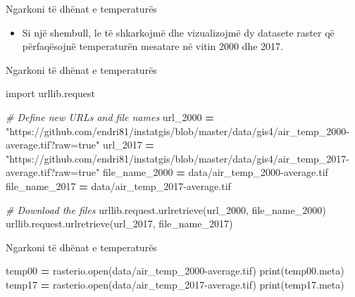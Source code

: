 \documentclass[
  ignorenonframetext,
]{beamer}
\newenvironment{Shaded}{\begin{snugshade}}{\end{snugshade}}
\newcommand{\BuiltInTok}[1]{#1}
\newcommand{\CommentTok}[1]{\textcolor[rgb]{0.56,0.35,0.01}{\textit{#1}}}
\newcommand{\ImportTok}[1]{#1}
\newcommand{\NormalTok}[1]{#1}
\newcommand{\OperatorTok}[1]{\textcolor[rgb]{0.81,0.36,0.00}{\textbf{#1}}}
\newcommand{\StringTok}[1]{\textcolor[rgb]{0.31,0.60,0.02}{#1}}
\providecommand{\tightlist}{%
  \setlength{\itemsep}{0pt}\setlength{\parskip}{0pt}}
\begin{document}
\begin{frame}{Ngarkoni të dhënat e temperaturës}
\protect\hypertarget{ngarkoni-tuxeb-dhuxebnat-e-temperaturuxebs}{}
\begin{itemize}
\tightlist
\item
  Si një shembull, le të shkarkojmë dhe vizualizojmë dy datasete raster
  që përfaqësojnë temperaturën mesatare në vitin 2000 dhe 2017.
\end{itemize}
\end{frame}

\begin{frame}[fragile]{Ngarkoni të dhënat e temperaturës}
\protect\hypertarget{ngarkoni-tuxeb-dhuxebnat-e-temperaturuxebs-1}{}

\begin{Shaded}
\begin{Highlighting}[]
\ImportTok{import}\NormalTok{ urllib.request}

\CommentTok{\# Define new URLs and file names}
\NormalTok{url\_2000 }\OperatorTok{=} \StringTok{"https://github.com/endri81/instatgis/blob/master/data/gis4/air\_temp\_2000{-}average.tif?raw=true"}
\NormalTok{url\_2017 }\OperatorTok{=} \StringTok{"https://github.com/endri81/instatgis/blob/master/data/gis4/air\_temp\_2017{-}average.tif?raw=true"}
\NormalTok{file\_name\_2000 }\OperatorTok{=} \StringTok{\textquotesingle{}data/air\_temp\_2000{-}average.tif\textquotesingle{}}
\NormalTok{file\_name\_2017 }\OperatorTok{=} \StringTok{\textquotesingle{}data/air\_temp\_2017{-}average.tif\textquotesingle{}}

\CommentTok{\# Download the files}
\NormalTok{urllib.request.urlretrieve(url\_2000, file\_name\_2000)}
\NormalTok{urllib.request.urlretrieve(url\_2017, file\_name\_2017)}
\end{Highlighting}
\end{Shaded}
\end{frame}

\begin{frame}[fragile]{Ngarkoni të dhënat e temperaturës}
\protect\hypertarget{ngarkoni-tuxeb-dhuxebnat-e-temperaturuxebs-2}{}

\begin{Shaded}
\begin{Highlighting}[]
\NormalTok{temp00 }\OperatorTok{=}\NormalTok{ rasterio.}\BuiltInTok{open}\NormalTok{(}\StringTok{\textquotesingle{}data/air\_temp\_2000{-}average.tif\textquotesingle{}}\NormalTok{)}
\BuiltInTok{print}\NormalTok{(temp00.meta)}
\NormalTok{temp17 }\OperatorTok{=}\NormalTok{ rasterio.}\BuiltInTok{open}\NormalTok{(}\StringTok{\textquotesingle{}data/air\_temp\_2017{-}average.tif\textquotesingle{}}\NormalTok{)}
\BuiltInTok{print}\NormalTok{(temp17.meta)}
\end{Highlighting}
\end{Shaded}
\end{frame}
\end{document}
